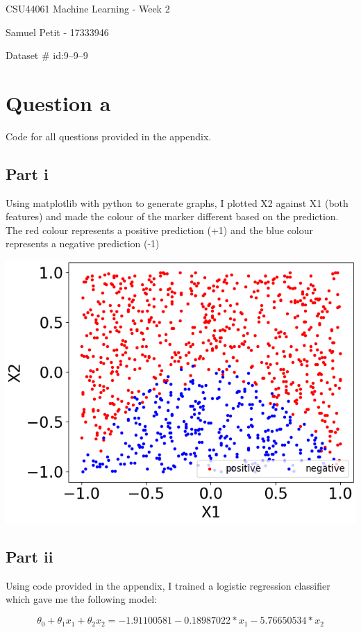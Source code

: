 \documentclass[10pt]{article}
\begin{document}
{\centering
    CSU44061 Machine Learning - Week 2
    \par
    Samuel Petit - 17333946
    \par
    Dataset \# id:9--9--9 
    \par
}
\section*{Question a}
Code for all questions provided in the appendix.
\subsection*{Part i}

Using matplotlib with python to generate graphs, I plotted X2 against X1 (both features)
and made the colour of the marker different based on the prediction.
The red colour represents a positive prediction (+1) and the blue colour represents a negative
prediction (-1)

\vspace{5mm} %

\includegraphics[scale=0.35]{Figure_1.png}

\subsection*{Part ii}
Using code provided in the appendix, I trained a logistic regression
classifier which gave me the following model:

\begin{equation*}
    \theta_{0} + \theta_{1}x_{1} + \theta_{2}x_{2} = -1.91100581 - 0.18987022 * x_{1} - 5.76650534 * x_{2}
\end{equation*}
\end{document}
